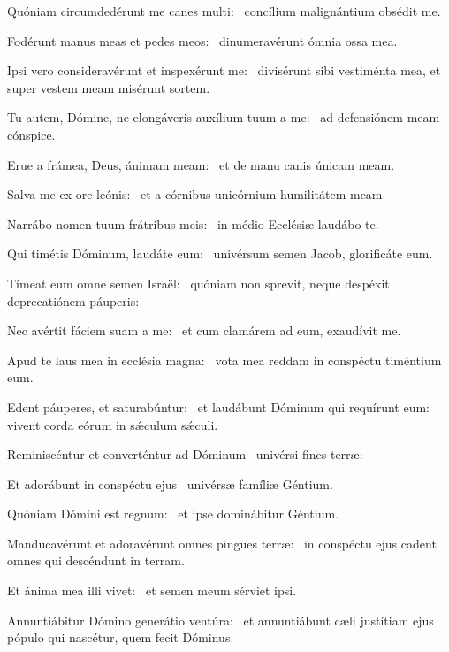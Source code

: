 \item Quóniam circumdedérunt me canes multi:~\psstar{} concílium malignántium obsédit me.

\item Fodérunt manus meas et pedes meos:~\psstar{} dinumeravérunt ómnia ossa mea.

\item Ipsi vero consideravérunt et inspexérunt me:~\psstar{} divisérunt sibi vestiménta mea, et super vestem meam misérunt sortem.

\item Tu autem, Dómine, ne elongáveris auxílium tuum a me:~\psstar{} ad defensiónem meam cónspice.

\item Erue a frámea, Deus, ánimam meam:~\psstar{} et de manu canis únicam meam.

\item Salva me ex ore leónis:~\psstar{} et a córnibus unicórnium humilitátem meam.

\item Narrábo nomen tuum frátribus meis:~\psstar{} in médio Ecclésiæ laudábo te.

\item Qui timétis Dóminum, laudáte eum:~\psstar{} univérsum semen Jacob, glorificáte eum.

\item Tímeat eum omne semen Israël:~\psstar{} quóniam non sprevit, neque despéxit deprecatiónem páuperis:

\item Nec avértit fáciem suam a me:~\psstar{} et cum clamárem ad eum, exaudívit me.

\item Apud te laus mea in ecclésia magna:~\psstar{} vota mea reddam in conspéctu timéntium eum.

\item Edent páuperes, et saturabúntur:~\pscross{} et laudábunt Dóminum qui requírunt eum:~\psstar{} vivent corda eórum in sǽculum sǽculi.

\item Reminiscéntur et converténtur ad Dóminum~\psstar{} univérsi fines terræ:

\item Et adorábunt in conspéctu ejus~\psstar{} univérsæ famíliæ Géntium.

\item Quóniam Dómini est regnum:~\psstar{} et ipse dominábitur Géntium.

\item Manducavérunt et adoravérunt omnes pingues terræ:~\psstar{} in conspéctu ejus cadent omnes qui descéndunt in terram.

\item Et ánima mea illi vivet:~\psstar{} et semen meum sérviet ipsi.

\item Annuntiábitur Dómino generátio ventúra:~\psstar{} et annuntiábunt cæli justítiam ejus pópulo qui nascétur, quem fecit Dóminus.
